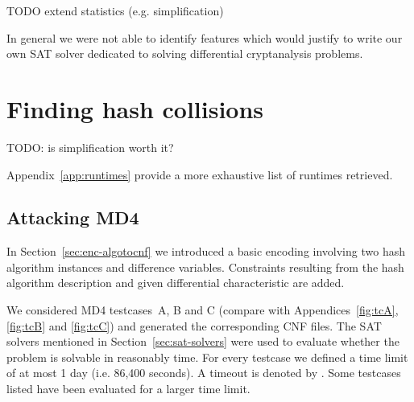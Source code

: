 TODO extend statistics (e.g. simplification)

In general we were not able to identify features which would justify to
write our own SAT solver dedicated to solving differential cryptanalysis problems.

\section{Finding hash collisions}
\label{sec:results-attacks}

TODO: is simplification worth it?

Appendix~\ref{app:runtimes} provide a more exhaustive list of runtimes retrieved.

\subsection{Attacking MD4}
\label{sec:results-md4}
%
In Section~\ref{sec:enc-algotocnf} we introduced a basic encoding involving two hash algorithm
instances and difference variables. Constraints resulting from the hash algorithm description
and given differential characteristic are added.

We considered MD4 testcases~A, B and C (compare with Appendices~\ref{fig:tcA}, \ref{fig:tcB} and \ref{fig:tcC})
and generated the corresponding CNF files. The SAT solvers mentioned in Section~\ref{sec:sat-solvers}
were used to evaluate whether the problem is solvable in reasonably time. For every testcase we
defined a time limit of at most 1 day (i.e. 86,400 seconds). A timeout is denoted by \timeout.
Some testcases listed have been evaluated for a larger time limit.

